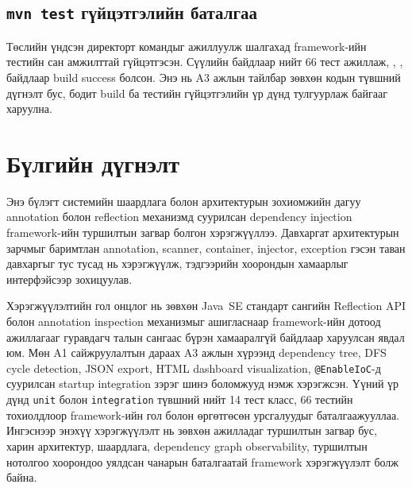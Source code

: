 \subsection{\texttt{mvn test} гүйцэтгэлийн баталгаа}

Төслийн үндсэн директорт  командыг ажиллуулж шалгахад
framework-ийн тестийн сан амжилттай гүйцэтгэсэн. Сүүлийн байдлаар нийт 66
тест ажиллаж, , , 
байдлаар build success болсон. Энэ нь A3 ажлын тайлбар зөвхөн кодын
түвшний дүгнэлт бус, бодит build ба тестийн гүйцэтгэлийн үр дүнд
тулгуурлаж байгааг харуулна.

\section{Бүлгийн дүгнэлт}

Энэ бүлэгт системийн шаардлага болон архитектурын зохиомжийн дагуу
annotation болон reflection механизмд суурилсан dependency injection
framework-ийн туршилтын загвар болгон хэрэгжүүллээ. Давхаргат архитектурын зарчмыг
баримтлан annotation, scanner, container, injector, exception гэсэн
таван давхаргыг тус тусад нь хэрэгжүүлж, тэдгээрийн хоорондын
хамаарлыг интерфэйсээр зохицуулав.

Хэрэгжүүлэлтийн гол онцлог нь зөвхөн Java~SE стандарт сангийн
Reflection API болон annotation inspection механизмыг ашигласнаар
framework-ийн дотоод ажиллагааг гуравдагч талын сангаас бүрэн
хамааралгүй байдлаар харуулсан явдал юм. Мөн A1 сайжруулалтын дараах
A3 ажлын хүрээнд dependency tree, DFS cycle detection, JSON export,
HTML dashboard visualization, \texttt{@EnableIoC}-д суурилсан startup
integration зэрэг шинэ боломжууд нэмж хэрэгжсэн. Үүний үр дүнд
\texttt{unit} болон \texttt{integration} түвшний нийт 14 тест класс,
66 тестийн тохиолдлоор framework-ийн гол болон өргөтгөсөн урсгалуудыг
баталгаажууллаа. Ингэснээр энэхүү хэрэгжүүлэлт нь зөвхөн ажилладаг
туршилтын загвар бус, харин архитектур, шаардлага, dependency graph
observability, туршилтын нотолгоо хоорондоо уялдсан чанарын баталгаатай
framework хэрэгжүүлэлт болж байна.
